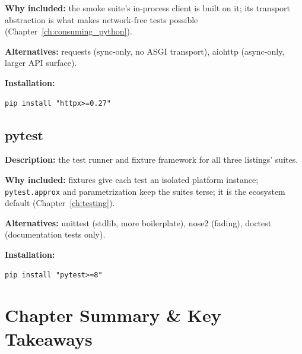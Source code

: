 \textbf{Why included:} the smoke suite's in-process client is built on it;
its transport abstraction is what makes network-free tests possible
(Chapter~\ref{ch:consuming_python}).

\textbf{Alternatives:} requests \cite{requestsdocs} (sync-only, no ASGI
transport), aiohttp (async-only, larger API surface).

\textbf{Installation:}
\begin{verbatim}
pip install "httpx>=0.27"
\end{verbatim}

\subsection{pytest}

\textbf{Description:} the test runner and fixture framework for all three
listings' suites.

\textbf{Why included:} fixtures give each test an isolated platform
instance; \texttt{pytest.approx} and parametrization keep the suites terse;
it is the ecosystem default (Chapter~\ref{ch:testing}).

\textbf{Alternatives:} unittest (stdlib, more boilerplate), nose2 (fading),
doctest (documentation tests only).

\textbf{Installation:}
\begin{verbatim}
pip install "pytest>=8"
\end{verbatim}

\section{Chapter Summary \& Key Takeaways}

